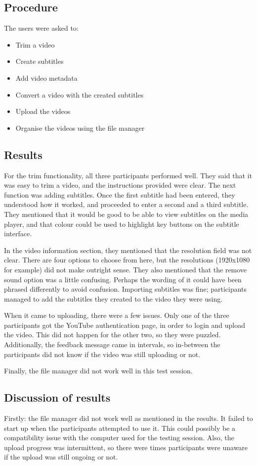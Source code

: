 \documentclass{sig-alternate-05-2015}
\begin{document}
\subsection*{Procedure}
The users were asked to:
\begin{itemize}
  \item Trim a video
  \item Create subtitles
  \item Add video metadata
  \item Convert a video with the created subtitles
  \item Upload the videos
  \item Organise the videos using the file manager
\end{itemize}

\subsection*{Results}
For the trim functionality, all three participants performed well. They said that it was easy to trim a video, and the instructions provided were clear. The next function was adding subtitles. Once the first subtitle had been entered, they understood how it worked, and proceeded to enter a second and a third subtitle. They mentioned that it would be good to be able to view subtitles on the media player, and that colour could be used to highlight key buttons on the subtitle interface.

In the video information section, they mentioned that the resolution field was not clear. There are four options to choose from here, but the resolutions (1920x1080 for example) did not make outright sense. They also mentioned that the remove sound option was a little confusing. Perhaps the wording of it could have been phrased differently to avoid confusion. Importing subtitles was fine; participants managed to add the subtitles they created to the video they were using.

When it came to uploading, there were a few issues. Only one of the three participants got the YouTube authentication page, in order to login and upload the video. This did not happen for the other two, so they were puzzled. Additionally, the feedback message came in intervals, so in-between the participants did not know if the video was still uploading or not.

Finally, the file manager did not work well in this test session.

\subsection*{Discussion of results}
  \noindent
  Firstly: the file manager did not work well as mentioned in the results. It failed to start up when the participants attempted to use it. This could possibly be a compatibility issue with the computer used for the testing session. Also, the upload progress was intermittent, so there were times participants were unaware if the upload was still ongoing or not.\\
  
\end{document}
